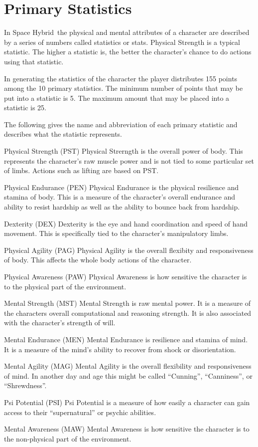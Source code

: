 \section{Primary Statistics}

In Space Hybrid\ the physical and mental attributes of a character
are described by a series of numbers called {statistics} or stats.
Physical Strength is a typical statistic. The higher a
statistic is, the better the character's chance to do actions using
that statistic.

In generating the statistics of the character the player distributes 155
points among the 10 primary statistics. The minimum number of points that may be
put into a statistic is 5. The maximum amount that may be placed into
a statistic is 25.

The following gives the name and abbreviation of each primary statistic and
describes what the statistic represents.

\begin{relate}
	\item[Physical Strength	(PST)]
	Physical Strerngth is the overall power of body. This represents
	the character's raw muscle power and is not tied to some particular
	set of limbs. Actions such as lifting are based on PST.
	\item[Physical Endurance (PEN)]
	Physical Endurance is the physical resilience and stamina of body.
	This is a measure of the character's overall endurance and ability
	to resist hardship as well as the ability to bounce back from hardship.
	\item[Dexterity	(DEX)]
	Dexterity is the eye and hand coordination and speed of hand movement.
	This is	specifically tied to the character's manipulatory limbs.
	\item[Physical Agility (PAG)]
	Physical Agility is the overall flexibity and responsiveness of body.
	This affects the whole body actions of the character.
	\item[Physical Awareness (PAW)]
	Physical Awareness is how sensitive the character is to
	the physical part of the environment.
	\item[Mental Strength (MST)]
	Mental Strength is raw mental power. It is a measure of the characters overall
	computational and reasoning strength. It is also associated with
	the character's strength of will.
	\item[Mental Endurance (MEN)]
	Mental Endurance is resilience and stamina of mind. It is a measure of the
	mind's ability to recover from shock or disorientation.
	\item[Mental Agility (MAG)]
	Mental Agility is the overall flexibility and responsiveness of mind.
	In another day and age this might be called ``Cunning'', ``Canniness'', or ``Shrewdness''.
	\item[Psi Potential (PSI)]
	Psi Potential is a measure of how easily a character can gain access to
	their ``supernatural'' or psychic abilities.
	\item[Mental Awareness (MAW)]
	Mental Awareness is how sensitive the character is to
	the non-physical part of the environment.
\end{relate}

